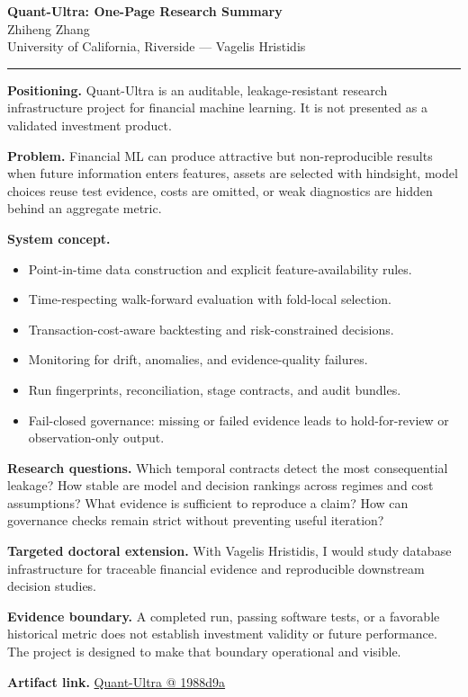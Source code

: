 \documentclass[11pt]{article}
\makeatletter
\newcommand{\ApplicantName}{Zhiheng Zhang}
\newcommand{\ApplicantGitHub}{\href{https://github.com/zhiheng-zhang-Mera/Quant-Ultra/tree/1988d9a8530da91a8158de864d098ea869098923}{Quant-Ultra @ 1988d9a}}
\makeatother
\begin{document}
\begin{center}
{\LARGE\bfseries Quant-Ultra: One-Page Research Summary}\\[0.25em]
{\large \ApplicantName}\\
University of California, Riverside --- Vagelis Hristidis
\end{center}
\vspace{0.35em}\hrule\vspace{0.65em}

\textbf{Positioning.} Quant-Ultra is an auditable, leakage-resistant research infrastructure project for financial machine learning. It is not presented as a validated investment product.

\textbf{Problem.} Financial ML can produce attractive but non-reproducible results when future information enters features, assets are selected with hindsight, model choices reuse test evidence, costs are omitted, or weak diagnostics are hidden behind an aggregate metric.

\textbf{System concept.}
\begin{itemize}
\item Point-in-time data construction and explicit feature-availability rules.
\item Time-respecting walk-forward evaluation with fold-local selection.
\item Transaction-cost-aware backtesting and risk-constrained decisions.
\item Monitoring for drift, anomalies, and evidence-quality failures.
\item Run fingerprints, reconciliation, stage contracts, and audit bundles.
\item Fail-closed governance: missing or failed evidence leads to hold-for-review or observation-only output.
\end{itemize}

\textbf{Research questions.} Which temporal contracts detect the most consequential leakage? How stable are model and decision rankings across regimes and cost assumptions? What evidence is sufficient to reproduce a claim? How can governance checks remain strict without preventing useful iteration?

\textbf{Targeted doctoral extension.} With Vagelis Hristidis, I would study database infrastructure for traceable financial evidence and reproducible downstream decision studies.

\textbf{Evidence boundary.} A completed run, passing software tests, or a favorable historical metric does not establish investment validity or future performance. The project is designed to make that boundary operational and visible.

\textbf{Artifact link.} \ApplicantGitHub
\end{document}
